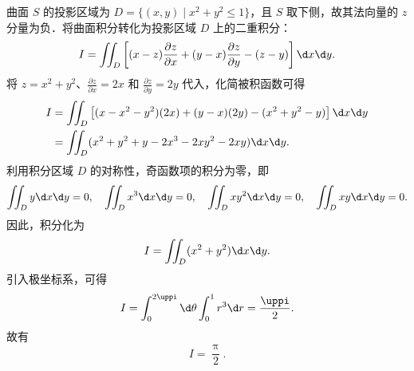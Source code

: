 \begin{solution}

    曲面 $S$ 的投影区域为 $D = \{(x, y) \mid x^2 + y^2 \le 1\}$，且 $S$ 取下侧，故其法向量的 $z$ 分量为负．将曲面积分转化为投影区域 $D$ 上的二重积分：
    \begin{equation}
        \label{eq:part5-1}
        I = \iint_D \left[ (x - z) \frac{\partial z}{\partial x} + (y - x) \frac{\partial z}{\partial y} - (z - y) \right] \d x \d y.
    \end{equation}
    将 $z = x^2 + y^2$、$\frac{\partial z}{\partial x} = 2x$ 和 $\frac{\partial z}{\partial y} = 2y$ 代入，化简被积函数可得
    \begin{equation}
        \label{eq:part5-2}
        \begin{aligned}
            I & = \iint_D \left[ (x - x^2 - y^2)(2x) + (y - x)(2y) - (x^2 + y^2 - y) \right] \d x \d y \\
              & = \iint_D (x^2 + y^2 + y - 2x^3 - 2xy^2 - 2xy) \d x \d y.
        \end{aligned}
    \end{equation}
    利用积分区域 $D$ 的对称性，奇函数项的积分为零，即
    \begin{equation}
        \label{eq:part5-3}
        \iint_D y \d x \d y = 0, \quad \iint_D x^3 \d x \d y = 0, \quad \iint_D xy^2 \d x \d y = 0, \quad \iint_D xy \d x \d y = 0.
    \end{equation}
    因此，积分化为
    \begin{equation}
        \label{eq:part5-4}
        I = \iint_D (x^2 + y^2) \d x \d y.
    \end{equation}
    引入极坐标系，可得
    \begin{equation}
        \label{eq:part5-5}
        I = \int_0^{2\uppi} \d \theta \int_0^1 r^3 \d r = \frac{\uppi}{2}.
    \end{equation}
    故有
    \begin{equation}
        \label{eq:part5-6}
        I = \boxed{\frac{\uppi}{2}}.
    \end{equation}



\end{solution}
